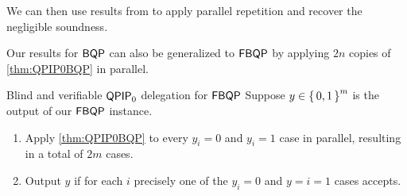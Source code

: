 We can then use results from \cite{parallelrep} to apply parallel repetition and recover the negligible soundness.

Our results for $\operatorname{\mathsf{BQP}}$ can also be generalized to $\operatorname{\mathsf{FBQP}}$ by applying $2n$ copies of \cref{thm:QPIP0BQP} in parallel.

\begin{protocol}{Blind and verifiable $\operatorname{\mathsf{QPIP}}_0$ delegation for $\operatorname{\mathsf{FBQP}}$}
	\label{QPIP0FBQP}
	Suppose $y\in\set{0,1}^m$ is the output of our $\operatorname{\mathsf{FBQP}}$ instance.
	\begin{enumerate}
		\item Apply \cref{thm:QPIP0BQP} to every $y_i=0$ and $y_i=1$ case in parallel, resulting in a total of $2m$ cases.
		\item Output $y$ if for each $i$ precisely one of the $y_i=0$ and $y=i=1$ cases accepts.
	\end{enumerate}
\end{protocol}

